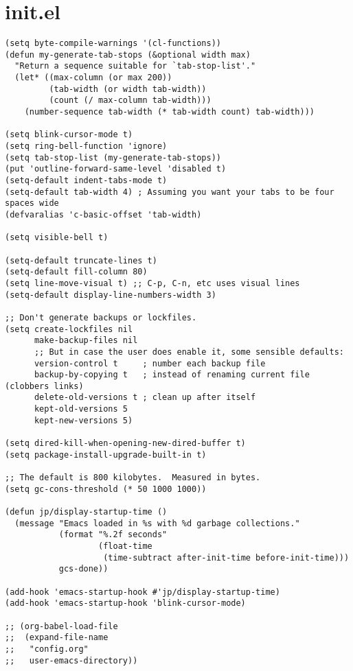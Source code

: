 \documentclass[11pt]{article}
\begin{document}
\section{init.el}
\label{sec:orgd6acb58}
\begin{verbatim}
(setq byte-compile-warnings '(cl-functions))
(defun my-generate-tab-stops (&optional width max)
  "Return a sequence suitable for `tab-stop-list'."
  (let* ((max-column (or max 200))
         (tab-width (or width tab-width))
         (count (/ max-column tab-width)))
    (number-sequence tab-width (* tab-width count) tab-width)))

(setq blink-cursor-mode t)
(setq ring-bell-function 'ignore)
(setq tab-stop-list (my-generate-tab-stops))
(put 'outline-forward-same-level 'disabled t)
(setq-default indent-tabs-mode t)
(setq-default tab-width 4) ; Assuming you want your tabs to be four spaces wide
(defvaralias 'c-basic-offset 'tab-width)

(setq visible-bell t)

(setq-default truncate-lines t)
(setq-default fill-column 80)
(setq line-move-visual t) ;; C-p, C-n, etc uses visual lines
(setq-default display-line-numbers-width 3)

;; Don't generate backups or lockfiles.
(setq create-lockfiles nil
      make-backup-files nil
      ;; But in case the user does enable it, some sensible defaults:
      version-control t     ; number each backup file
      backup-by-copying t   ; instead of renaming current file (clobbers links)
      delete-old-versions t ; clean up after itself
      kept-old-versions 5
      kept-new-versions 5)

(setq dired-kill-when-opening-new-dired-buffer t)
(setq package-install-upgrade-built-in t)

;; The default is 800 kilobytes.  Measured in bytes.
(setq gc-cons-threshold (* 50 1000 1000))

(defun jp/display-startup-time ()
  (message "Emacs loaded in %s with %d garbage collections."
           (format "%.2f seconds"
                   (float-time
                    (time-subtract after-init-time before-init-time)))
           gcs-done))

(add-hook 'emacs-startup-hook #'jp/display-startup-time)
(add-hook 'emacs-startup-hook 'blink-cursor-mode)

;; (org-babel-load-file
;;  (expand-file-name
;;   "config.org"
;;   user-emacs-directory))


\end{verbatim}
\end{document}
